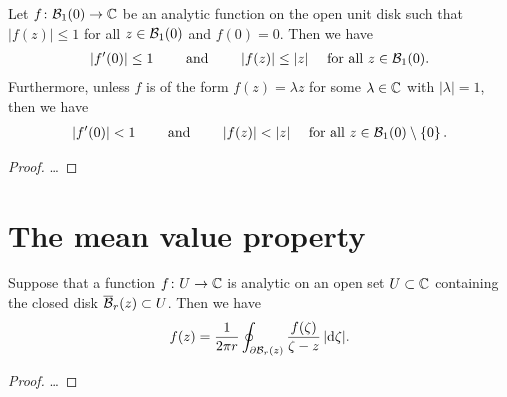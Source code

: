 \begin{lemma}
  \label{lem:schwarz_lemma}
  Let $f \colon \mathcal{B}_{{1}}(0) \to \mathbb{C}$ be an analytic function
  on the open unit disk such that $|f(z)| \le 1$
  for all $z \in \mathcal{B}_{{1}}(0)$ and $f(0) = 0$.
  Then we have
  \begin{align*}
    |f'(0)| \le 1
    \qquad \text{ and } \qquad
    |f(z)| \le |z| \quad \text{ for all } z \in \mathcal{B}_{{1}}(0) .
  \end{align*}
  Furthermore, unless $f$ is of the form $f(z) = \lambda z$ for
  some $\lambda \in \mathbb{C}$ with $|\lambda| = 1$, then we have
  \begin{align*}
    |f'(0)| < 1
    \qquad \text{ and } \qquad
    |f(z)| < |z| \quad \text{ for all } z \in \mathcal{B}_{{1}}(0) \setminus \left\{ 0 \right\}.
  \end{align*}
\end{lemma}
\begin{proof}
  \ldots
\end{proof}



\section{The mean value property}

\begin{theorem}
  \label{thm:mean_value_property}
  Suppose that a function $f \colon U \to \mathbb{C}$ is analytic on an open
  set $U \subset \mathbb{C}$ containing the closed disk $\overline{\mathcal{B}}_{r}(z) \subset U$.
  Then we have
  \begin{align*}
    f(z) = \frac{1}{2 \pi r} \oint_{\partial \mathcal{B}_{{r}}(z)}
            \frac{f(\zeta)}{\zeta - z} \, |\mathrm{d} \zeta| .
  \end{align*}
\end{theorem}
\begin{proof}
  \ldots
\end{proof}
